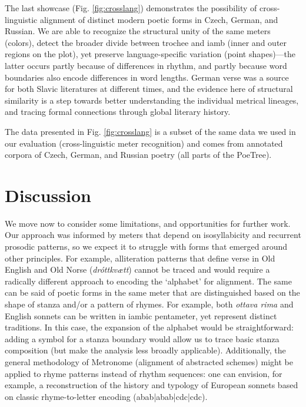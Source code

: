 \documentclass[
    hf
]{ceurart}
\begin{document}
The last showcase (Fig. \ref{fig:crosslang}) demonstrates the possibility of cross-linguistic alignment of distinct modern poetic forms in Czech, German, and Russian. We are able to recognize the structural unity of the same meters (colors), detect the broader divide between trochee and iamb (inner and outer regions on the plot), yet preserve language-specific variation (point shapes)---the latter occurs partly because of differences in rhythm, and partly because word boundaries also encode differences in word lengths. German verse was a source for both Slavic literatures at different times, and the evidence here of structural similarity is a step towards better understanding the individual metrical lineages, and tracing formal connections through global literary history.

The data presented in Fig. \ref{fig:crosslang} is a subset of the same data we used in our evaluation (cross-linguistic meter recognition) and comes from annotated corpora of Czech, German, and Russian poetry (all parts of the PoeTree).

\section{Discussion}

We move now to consider some limitations, and opportunities for further work. Our approach was informed by meters that depend on isosyllabicity and recurrent prosodic patterns, so we expect it to struggle with forms that emerged around other principles. For example, alliteration patterns that define verse in Old English and Old Norse (\textit{dróttkvætt}) cannot be traced and would require a radically different approach to encoding the `alphabet' for alignment. The same can be said of poetic forms in the same meter that are distinguished based on the shape of stanza and/or a pattern of rhymes. For example, both \textit{ottava rima} and English sonnets can be written in iambic pentameter, yet represent distinct traditions. In this case, the expansion of the alphabet would be straightforward: adding a symbol for a stanza boundary would allow us to trace basic stanza composition (but make the analysis less broadly applicable). Additionally, the general methodology of Metronome (alignment of abstracted schemes) might be applied to rhyme patterns instead of rhythm sequences: one can envision, for example, a reconstruction of the history and typology of European sonnets based on classic rhyme-to-letter encoding (abab|abab|cdc|cdc).
\end{document}
